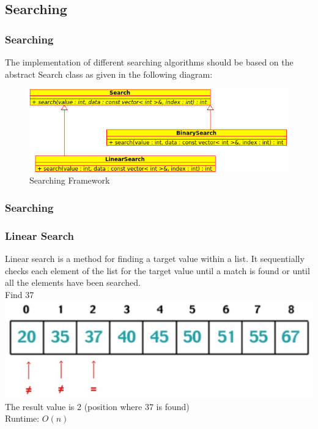 \subsection{Searching}

\begin{frame}[fragile]
\frametitle{Searching}

The implementation of different searching algorithms should be based on
the abstract Search class as given in the following diagram:

\begin{figure}[h]
\centering\includegraphics[scale=0.5]{img/search.png}
\caption{Searching Framework}
\end{figure}

\end{frame}

\begin{frame}[fragile]
\frametitle{Searching}
{\tiny

}

\end{frame}

\begin{frame}[fragile]
\frametitle{Linear Search}
Linear search is a method for finding a target value within a list.
It sequentially checks each element of the list for the target value until a match
is found or until all the elements have been searched.\\
\vspace{2mm}
Find 37\\
\includegraphics[scale=0.5]{img/linearsearch.png}\\
The result value is 2 (position where 37 is found)\\
\vspace{2mm}
Runtime: $O(n)$
\end{frame}


